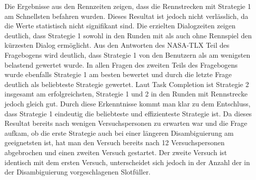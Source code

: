 \documentclass[12pt,a4paper]{scrartcl}
\begin{document}
Die Ergebnisse aus den Rennzeiten zeigen, dass die Rennstrecken mit Strategie 1 am Schnellsten befahren wurden. Dieses Resultat ist jedoch nicht verlässlich, da die Werte statistisch nicht signifikant sind.
Die erzielten Dialogzeiten zeigen deutlich, dass Strategie 1 sowohl in den Runden mit als auch ohne Rennspiel den kürzesten Dialog ermöglicht. Aus den Antworten des NASA-TLX Teil des Fragebogens wird deutlich, dass Strategie 1 von den Benutzern als am wenigsten belastend gewertet wurde.  In allen Fragen des zweiten Teils des Fragebogens wurde ebenfalls Strategie 1 am besten bewertet und durch die letzte Frage deutlich als beliebteste Strategie gewertet. Laut Task Completion ist Strategie 2 insgesamt am erfolgreichsten, Strategie 1 und 2 in den Runden mit Rennstrecke jedoch gleich gut.
Durch diese Erkenntnisse kommt man klar zu dem Entschluss, dass Strategie 1 eindeutig die beliebteste und effizienteste Strategie ist. \newline \newline
Da dieses Resultat bereits nach wenigen Versuchspersonen zu erwarten war und die Frage aufkam, ob die erste Strategie auch bei einer längeren Disambiguierung am geeignetsten ist, hat man den Versuch bereits nach 12 Versuchspersonen abgebrochen und einen zweiten Versuch gestartet. Der zweite Versuch ist identisch mit dem ersten Versuch, unterscheidet sich jedoch in der Anzahl der in der Disambiguierung vorgeschlagenen Slotfüller. 
\end{document}
